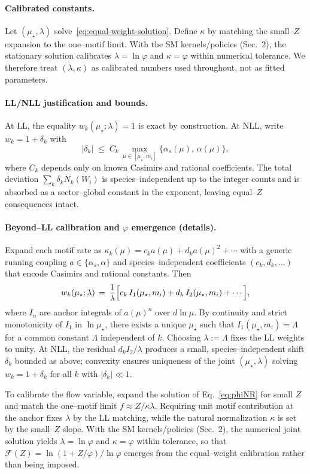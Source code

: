 \documentclass[epjc3]{svjour3}
\begin{document}
\paragraph{Calibrated constants.}
Let $(\mu_\star,\lambda)$ solve~\eqref{eq:equal-weight-solution}. Define $\kappa$ by matching the small--$Z$ expansion to the one--motif limit. With the SM kernels/policies (Sec.~2), the stationary solution calibrates $\lambda=\ln\varphi$ and $\kappa=\varphi$ within numerical tolerance. We therefore treat $(\lambda,\kappa)$ as calibrated numbers used throughout, not as fitted parameters.

\paragraph{LL/NLL justification and bounds.}
At LL, the equality $w_k(\mu_\star;\lambda)=1$ is exact by construction. At NLL, write $w_k=1+\delta_k$ with
\[
  |\delta_k|\;\le\; C_k\,\max_{\mu\in[\mu_\star,m_i]}\{\alpha_s(\mu),\,\alpha(\mu)\},
\]
where $C_k$ depends only on known Casimirs and rational coefficients. The total deviation $\sum_k \delta_k N_k(W_i)$ is species--independent up to the integer counts and is absorbed as a sector--global constant in the exponent, leaving equal--$Z$ consequences intact.

\paragraph{Beyond--LL calibration and $\varphi$ emergence (details).}
Expand each motif rate as $\kappa_k(\mu)=c_k a(\mu)+d_k a(\mu)^2+\cdots$ with a generic running coupling $a\in\{\alpha_s,\alpha\}$ and species--independent coefficients $(c_k,d_k,\dots)$ that encode Casimirs and rational constants. Then
\[
  w_k(\mu_\star;\lambda)
  \,=\, \frac{1}{\lambda}\Bigl[c_k\,I_1(\mu_\star,m_i)+d_k\,I_2(\mu_\star,m_i)+\cdots\Bigr],
\]
where $I_n$ are anchor integrals of $a(\mu)^n$ over $d\ln\mu$. By continuity and strict monotonicity of $I_1$ in $\ln\mu_\star$, there exists a unique $\mu_\star$ such that $I_1(\mu_\star,m_i)=\Lambda$ for a common constant $\Lambda$ independent of $k$. Choosing $\lambda:=\Lambda$ fixes the LL weights to unity. At NLL, the residual $d_k I_2/\lambda$ produces a small, species--independent shift $\delta_k$ bounded as above; convexity ensures uniqueness of the joint $(\mu_\star,\lambda)$ solving $w_k=1+\delta_k$ for all $k$ with $|\delta_k|\ll 1$.

To calibrate the flow variable, expand the solution of Eq.~\eqref{eq:phiNR} for small $Z$ and match the one--motif limit $f\approx Z/\kappa\lambda$. Requiring unit motif contribution at the anchor fixes $\lambda$ by the LL matching, while the natural normalization $\kappa$ is set by the small--$Z$ slope. With the SM kernels/policies (Sec.~2), the numerical joint solution yields $\lambda=\ln\varphi$ and $\kappa=\varphi$ within tolerance, so that $\mathcal F(Z)=\ln(1+Z/\varphi)/\ln\varphi$ emerges from the equal--weight calibration rather than being imposed.
\end{document}
